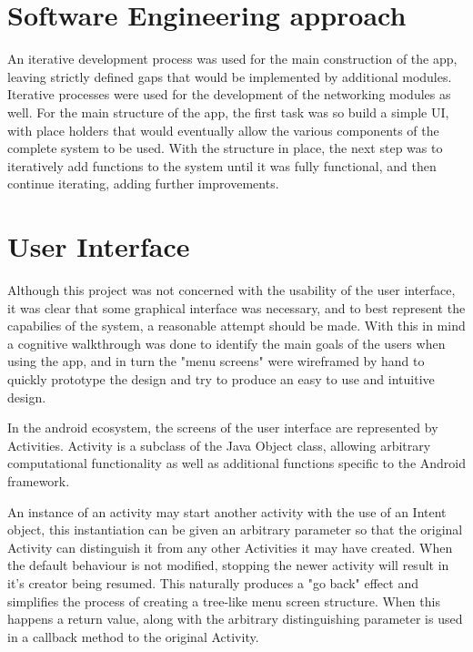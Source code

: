 \section{Software Engineering approach}
An iterative development process was used for the main construction of the app, leaving strictly defined gaps that would be implemented by additional modules.
Iterative processes were used for the development of the networking modules as well.
For the main structure of the app, the first task was so build a simple UI, with place holders that would eventually allow the various components of the complete system to be used.
With the structure in place, the next step was to iteratively add functions to the system until it was fully functional, and then continue iterating, adding further improvements.

\section{User Interface}

Although this project was not concerned with the usability of the user interface, it was clear that some graphical interface was necessary, and to best represent the capabilies of the system, a reasonable attempt should be made. With this in mind a cognitive walkthrough was done to identify the main goals of the users when using the app, and in turn the "menu screens" were wireframed by hand to quickly prototype the design and try to produce an easy to use and intuitive design.

In the android ecosystem, the screens of the user interface are represented by Activities. Activity is a subclass of the Java Object class, allowing arbitrary computational functionality as well as additional functions specific to the Android framework.

An instance of an activity may start another activity with the use of an Intent object, this instantiation can be given an arbitrary parameter so that the original Activity can distinguish it from any other Activities it may have created. When the default behaviour is not modified, stopping the newer activity will result in it's creator being resumed. This naturally produces a "go back" effect and simplifies the process of creating a tree-like menu screen structure. When this happens a return value, along with the arbitrary distinguishing parameter is used in a callback method to the original Activity.

